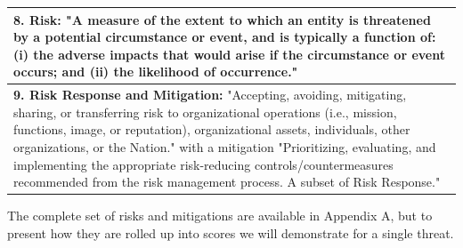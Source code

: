 \documentclass{article}
\begin{document}
\begin{table}[h!]
\begin{tabular}{p{12cm}}
    \midrule
    \textbf{8. Risk:} "A measure of the extent to which an entity is threatened by a potential circumstance or event, and is typically a function of: (i) the adverse impacts that would arise if the circumstance or event occurs; and (ii) the likelihood of occurrence." \\
    \midrule
    \textbf{9. Risk Response and Mitigation:} "Accepting, avoiding, mitigating, sharing, or transferring risk to organizational operations (i.e., mission, functions, image, or reputation), organizational assets, individuals, other organizations, or the Nation." with a mitigation "Prioritizing, evaluating, and implementing the appropriate risk-reducing controls/countermeasures recommended from the risk management process. A subset of Risk Response." \\
    \bottomrule
  \end{tabular}
\end{table}


The complete set of risks and mitigations are available in Appendix A, but to present how they are rolled up into scores we will demonstrate for a single threat.
\end{document}
